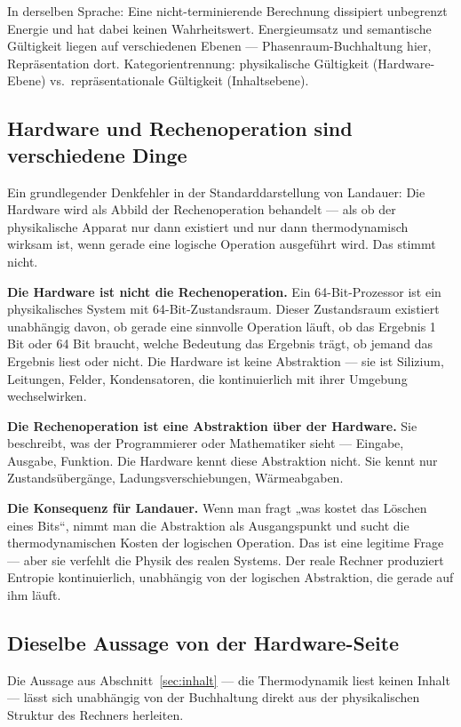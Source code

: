 In derselben Sprache: Eine nicht-terminierende Berechnung dissipiert unbegrenzt
Energie und hat dabei keinen Wahrheitswert. Energieumsatz und semantische
Gültigkeit liegen auf verschiedenen Ebenen --- Phasenraum-Buchhaltung hier,
Repräsentation dort. Kategorientrennung: physikalische Gültigkeit
(Hardware-Ebene) vs.\ repräsentationale Gültigkeit (Inhaltsebene).

\subsection{Hardware und Rechenoperation sind verschiedene Dinge}

Ein grundlegender Denkfehler in der Standarddarstellung von Landauer: Die Hardware
wird als Abbild der Rechenoperation behandelt --- als ob der physikalische Apparat
nur dann existiert und nur dann thermodynamisch wirksam ist, wenn gerade eine
logische Operation ausgeführt wird. Das stimmt nicht.

\LB \textbf{Die Hardware ist nicht die Rechenoperation.} Ein 64-Bit-Prozessor ist
ein physikalisches System mit 64-Bit-Zustandsraum. Dieser Zustandsraum existiert
unabhängig davon, ob gerade eine sinnvolle Operation läuft, ob das Ergebnis 1 Bit
oder 64 Bit braucht, welche Bedeutung das Ergebnis trägt, ob jemand das Ergebnis
liest oder nicht. Die Hardware ist keine Abstraktion --- sie ist Silizium,
Leitungen, Felder, Kondensatoren, die kontinuierlich mit ihrer Umgebung
wechselwirken.

\LB \textbf{Die Rechenoperation ist eine Abstraktion über der Hardware.} Sie
beschreibt, was der Programmierer oder Mathematiker sieht --- Eingabe, Ausgabe,
Funktion. Die Hardware kennt diese Abstraktion nicht. Sie kennt nur
Zustandsübergänge, Ladungsverschiebungen, Wärmeabgaben.

\textbf{Die Konsequenz für Landauer.} Wenn man fragt „was kostet das Löschen eines
Bits“, nimmt man die Abstraktion als Ausgangspunkt und sucht die thermodynamischen
Kosten der logischen Operation. Das ist eine legitime Frage --- aber sie verfehlt
die Physik des realen Systems. Der reale Rechner produziert Entropie
kontinuierlich, unabhängig von der logischen Abstraktion, die gerade auf ihm
läuft.

\subsection{Dieselbe Aussage von der Hardware-Seite}

Die Aussage aus Abschnitt~\ref{sec:inhalt} --- die Thermodynamik liest keinen
Inhalt --- lässt sich unabhängig von der Buchhaltung direkt aus der physikalischen
Struktur des Rechners herleiten.

